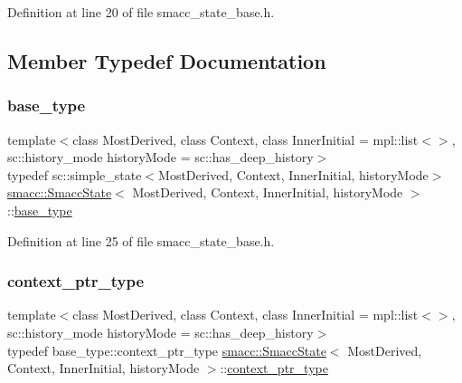 Definition at line 20 of file smacc\+\_\+state\+\_\+base.\+h.



\subsection{Member Typedef Documentation}
\mbox{\label{classsmacc_1_1SmaccState_a68f547c6fe147554bbe607b6fcd8e40a}} 
\subsubsection{\texorpdfstring{base\+\_\+type}{base\_type}}
{\footnotesize\ttfamily template$<$class Most\+Derived, class Context, class Inner\+Initial = mpl\+::list$<$$>$, sc\+::history\+\_\+mode history\+Mode = sc\+::has\+\_\+deep\+\_\+history$>$ \\
typedef sc\+::simple\+\_\+state$<$Most\+Derived, Context, Inner\+Initial, history\+Mode$>$ \hyperlink{classsmacc_1_1SmaccState}{smacc\+::\+Smacc\+State}$<$ Most\+Derived, Context, Inner\+Initial, history\+Mode $>$\+::\hyperlink{classsmacc_1_1SmaccState_a68f547c6fe147554bbe607b6fcd8e40a}{base\+\_\+type}\hspace{0.3cm}{\ttfamily [private]}}



Definition at line 25 of file smacc\+\_\+state\+\_\+base.\+h.

\mbox{\label{classsmacc_1_1SmaccState_a0e15b77514301039f6bc093a9d3f6425}} 
\subsubsection{\texorpdfstring{context\+\_\+ptr\+\_\+type}{context\_ptr\_type}}
{\footnotesize\ttfamily template$<$class Most\+Derived, class Context, class Inner\+Initial = mpl\+::list$<$$>$, sc\+::history\+\_\+mode history\+Mode = sc\+::has\+\_\+deep\+\_\+history$>$ \\
typedef base\+\_\+type\+::context\+\_\+ptr\+\_\+type \hyperlink{classsmacc_1_1SmaccState}{smacc\+::\+Smacc\+State}$<$ Most\+Derived, Context, Inner\+Initial, history\+Mode $>$\+::\hyperlink{classsmacc_1_1SmaccState_a0e15b77514301039f6bc093a9d3f6425}{context\+\_\+ptr\+\_\+type}}



